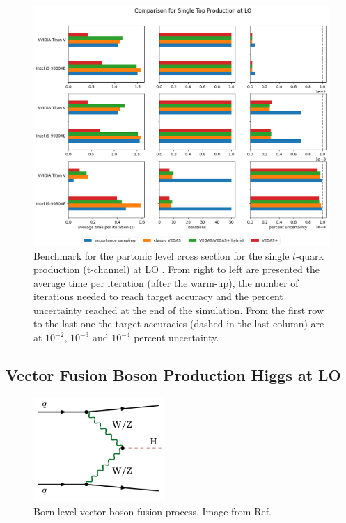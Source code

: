 \documentclass[../main/main.tex]{subfiles}
\begin{document}
\begin{figure}[]
	\centering
	\includegraphics[width=\textwidth]{../images/singletop_final.png}
	\caption{Benchmark  for the partonic level cross section for the single $t$-quark production (t-channel)  at LO \cite{Brucherseifer_2014}. From right to left are presented the average time per iteration (after the warm-up), the number of iterations needed to reach target accuracy and the percent uncertainty reached at the end of the simulation. From the first row to the last one the target accuracies (dashed in the last column) are at $10^{-2}$, $10^{-3}$ and $10^{-4}$ percent uncertainty.}
	\label{singletop_plot}
\end{figure}
 
\subsection{Vector Fusion Boson Production Higgs at LO}

\begin{figure}[]
	\centering
	\includegraphics[width=5cm]{../images/vfb_image.png}
	\caption{ Born-level vector boson fusion process. Image from Ref\cite{Cruz_Martinez_2018}.}
	\label{vfb}
\end{figure}
\end{document}
